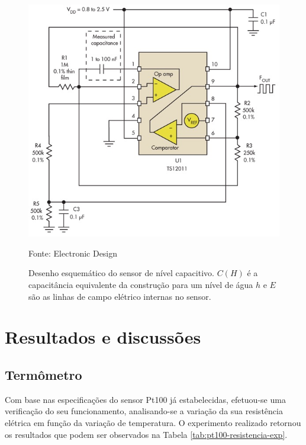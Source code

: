 \documentclass[a4paper]{instrumentacao}
\begin{document}
\begin{figure}[H]
	\centering \includegraphics[width=\textwidth]{SensorNivelCapacitivo-Condicionamento.jpg}
	\caption{Desenho esquemático do sensor de nível capacitivo. $C(H)$ é a capacitância equivalente da construção para um nível de água $h$ e $E$ são as linhas de campo elétrico internas no sensor.}
	Fonte: Electronic Design \cite{medicao-capacitancia}
	\label{fig:sensor-nivel-capacitivo-condicionamento}
\end{figure}

\chapter{Resultados e discussões}

\section{Termômetro}

Com base nas especificações do sensor Pt100 já estabelecidas, efetuou-se uma verificação do seu funcionamento, analisando-se a variação da sua resistência elétrica em função da variação de temperatura. O experimento realizado retornou os resultados que podem ser observados na Tabela \ref{tab:pt100-resistencia-exp}.
\end{document}

